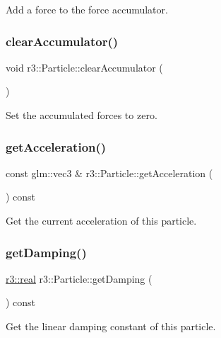 Add a force to the force accumulator. \mbox{\label{classr3_1_1_particle_a1ba9a33fb4513cf79eb8bf4954ec6b97}} 
\subsubsection{\texorpdfstring{clear\+Accumulator()}{clearAccumulator()}}
{\footnotesize\ttfamily void r3\+::\+Particle\+::clear\+Accumulator (\begin{DoxyParamCaption}{ }\end{DoxyParamCaption})}

Set the accumulated forces to zero. \mbox{\label{classr3_1_1_particle_ab97ffa1b19d4fda5ea49b67531d0300d}} 
\subsubsection{\texorpdfstring{get\+Acceleration()}{getAcceleration()}}
{\footnotesize\ttfamily const glm\+::vec3 \& r3\+::\+Particle\+::get\+Acceleration (\begin{DoxyParamCaption}{ }\end{DoxyParamCaption}) const}

Get the current acceleration of this particle. \mbox{\label{classr3_1_1_particle_a6f05d81870e5566701760873082ae1b0}} 
\subsubsection{\texorpdfstring{get\+Damping()}{getDamping()}}
{\footnotesize\ttfamily \mbox{\hyperlink{namespacer3_ab2016b3e3f743fb735afce242f0dc1eb}{r3\+::real}} r3\+::\+Particle\+::get\+Damping (\begin{DoxyParamCaption}{ }\end{DoxyParamCaption}) const}

Get the linear damping constant of this particle. \mbox{\label{classr3_1_1_particle_a81fe0cfac976df7da6337dabc8f73313}} 
